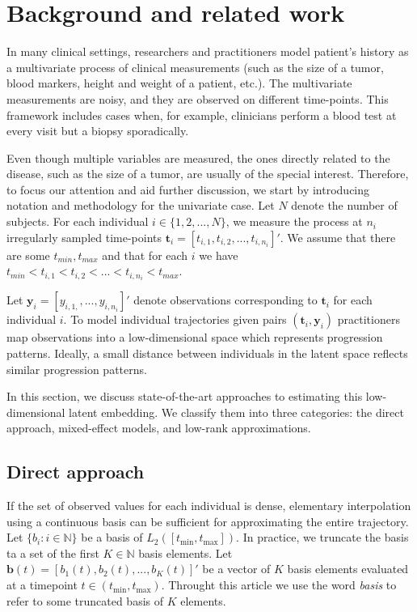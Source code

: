 \documentclass[preprint]{imsart}
\numberwithin{equation}{section}
\theoremstyle{plain}
\newcommand{\N}{\mathbb{N}}
\newcommand{\bt}{\mathbf{t}}
\newcommand{\by}{\mathbf{y}}
\newcommand{\bb}{\mathbf{b}}
\begin{document}
\section{Background and related work}\label{s:background}

In many clinical settings, researchers and practitioners model patient's history as a multivariate process of clinical measurements (such as the size of a tumor, blood markers, height and weight of a patient, etc.). The multivariate measurements are noisy, and they are observed on different time-points. This framework includes cases when, for example, clinicians perform a blood test at every visit but a biopsy sporadically. 

Even though multiple variables are measured, the ones directly related to the disease, such as the size of a tumor, are usually of the special interest. Therefore, to focus our attention and aid further discussion, we start by introducing notation and methodology for the univariate case. Let $N$ denote the number of subjects. For each individual $i \in \{ 1,2,...,N \}$, we measure the process at $n_i$ irregularly sampled time-points $\mathbf{t}_i = [t_{i,1},t_{i,2},...,t_{i,n_i}]'$. We assume that there are some $t_{min},t_{max}$ and that for each $i$ we have $t_{min} < t_{i,1} < t_{i,2} < ... < t_{i,n_i} < t_{max}$.

Let $\by_i = [y_{i,1,},...,y_{i,n_i}]'$ denote observations corresponding to $\bt_i$ for each individual $i$. To model individual trajectories given pairs $(\mathbf{t}_i,\mathbf{y}_i)$ practitioners map observations into a low-dimensional space which represents progression patterns. Ideally, a small distance between individuals in the latent space reflects similar progression patterns.

In this section, we discuss state-of-the-art approaches to estimating this low-dimensional latent embedding. We classify them into three categories: the direct approach, mixed-effect models, and low-rank approximations. 

\subsection{Direct approach}\label{ss:direct}

If the set of observed values for each individual is dense, elementary interpolation using a continuous basis can be sufficient for approximating the entire trajectory. Let $\{b_i: i \in \N \}$ be a basis of $L_2([t_{\min},t_{\max}])$. In practice, we truncate the basis ta a set of the first $K \in \N$ basis elements. Let $\bb(t) = [b_1(t),b_2(t),...,b_K(t)]'$ be a vector of $K$ basis elements evaluated at a timepoint $t \in (t_{\min},t_{\max})$. Throught this article we use the word \emph{basis} to refer to some truncated basis of $K$ elements.
\end{document}
